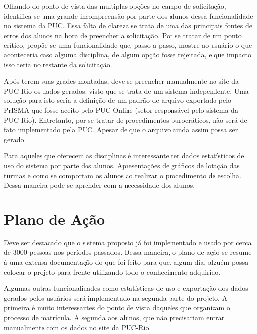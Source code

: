 \documentclass[graduacao,brazil]{ThesisPUC}
\begin{document}
Olhando do ponto de vista das multiplas op\c{c}ões no campo de solicita\c{c}\~{a}o, identifica-se uma grande incompreens\~{a}o por parte dos alunos dessa funcionalidade no sistema da PUC. Essa falta de clareza se trata de uma das principais fontes de erros dos alunos na hora de preencher a solicita\c{c}\~{a}o. Por se tratar de um ponto cr\'{i}tico, propõe-se uma funcionalidade que, passo a passo, mostre ao usu\'{a}rio o que aconteceria caso alguma disciplina, de algum op\c{c}\~{a}o fosse rejeitada, e que impacto isso teria no restante da solicita\c{c}\~{a}o.

Ap\'{o}s terem suas grades montadas, deve-se preencher manualmente no site da PUC-Rio os dados gerados, visto que se trata de um sistema independente. Uma solu\c{c}\~{a}o para isto seria a defini\c{c}\~{a}o de um padr\~{a}o de arquivo exportado pelo PrISMA que fosse aceito pelo PUC Online (setor respons\'{a}vel pelo sistema da PUC-Rio). Entretanto, por se tratar de procedimentos burocr\'{a}ticos, n\~{a}o ser\'{a} de fato implementado pela PUC. Apesar de que o arquivo ainda assim possa ser gerado.

Para aqueles que oferecem as disciplinas \'{e} interessante ter dados estat\'{i}sticos de uso do sistema por parte dos alunos. Apresenta\c{c}ões de gr\'{a}ficos de lota\c{c}\~{a}o das turmas e como se comportam os alunos ao realizar o procedimento de escolha. Dessa maneira pode-se aprender com a necessidade dos alunos.


\chapter{Plano de A\c{c}\~ao}

Deve ser destacado que o sistema proposto j\'{a} foi implementado e usado por cerca de 3000 pessoas nos per\'{i}odos passados. Dessa maneira, o plano de a\c{c}\~{a}o se resume \`{a} uma extensa documenta\c{c}\~{a}o do que foi feito para que, algum dia, algu\'{e}m possa colocar o projeto para frente utilizando todo o conhecimento adquirido.

Algumas outras funcionalidades como estat\'{i}sticas de uso e exporta\c{c}\~{a}o dos dados gerados pelos usu\'{a}rios ser\'{a} implementado na segunda parte do projeto. A primeira \'{e} muito interessantes do ponto de vista daqueles que organizam o processo de matr\'{i}cula. A segunda aos alunos, que n\~{a}o precisariam entrar manualmente com os dados no site da PUC-Rio.
\end{document}
